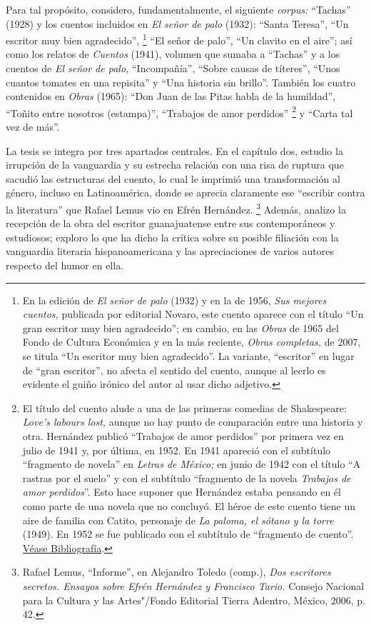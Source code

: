 \documentclass[14pt,twoside,final]{extbook} %
\let\oldfootnote\footnote
\renewcommand\footnote[1]{%
\oldfootnote{\hspace{1mm}#1}}
\begin{document}
Para tal propósito, considero, fundamentalmente, el siguiente \emph{corpus:} ``Tachas'' (1928) y los cuentos incluidos en \emph{El señor de palo} (1932): ``Santa Teresa'', ``Un escritor muy bien agradecido'',\footnote{En la edición de \emph{El señor de palo} (1932) y en la de 1956, \emph{Sus mejores cuentos,} publicada por editorial Novaro, este cuento aparece con el título ``Un gran escritor muy bien agradecido''; en cambio, en las \emph{Obras} de 1965 del Fondo de Cultura Económica y en la más reciente, \emph{Obras completas,} de 2007, se titula ``Un escritor muy bien agradecido''. La variante, ``escritor'' en lugar de ``gran escritor'', no afecta el sentido del cuento, aunque al leerlo es evidente el guiño irónico del autor al usar dicho adjetivo.} ``El señor de palo'', ``Un clavito en el aire''; así como los relatos de \emph{Cuentos} (1941), volumen que sumaba a ``Tachas'' y a los cuentos de \emph{El señor de palo,} ``Incompañía'', ``Sobre causas de títeres'', ``Unos cuantos tomates en una repisita'' y ``Una historia sin brillo''. También los cuatro contenidos en \emph{Obras} (1965): ``Don Juan de las Pitas habla de la humildad'', ``Toñito entre nosotros (estampa)'', ``Trabajos de amor perdidos''\footnote{El título del cuento alude a una de las primeras comedias de Shakespeare: \emph{Love's labours lost,} aunque no hay punto de comparación entre una historia y otra. Hernández publicó ``Trabajos de amor perdidos'' por primera vez en julio de 1941 y, por última, en 1952. En 1941 apareció con el subtítulo ``fragmento de novela'' en \emph{Letras de México;} en junio de 1942 con el título ``A rastras por el suelo'' y con el subtítulo ``fragmento de la novela \emph{Trabajos de amor perdidos}''. Esto hace suponer que Hernández estaba pensando en él como parte de una novela que no concluyó. El héroe de este cuento tiene un aire de familia con Catito, personaje de \emph{La paloma, el sótano y la torre} (1949). En 1952 se fue publicado con el subtítulo de ``fragmento de cuento''. \hyperref[bib:hernandez1952]{Véase Bibliografía}.} y ``Carta tal vez de más''.

La tesis se integra por tres apartados centrales. En el capítulo dos, estudio la irrupción de la vanguardia y su estrecha relación con una risa de ruptura que sacudió las estructuras del cuento, lo cual le imprimió una transformación al género, incluso en Latinoamérica, donde se aprecia claramente ese ``escribir contra la literatura'' que Rafael Lemus vio en Efrén Hernández.\footnote{Rafael Lemus, ``Informe'', en Alejandro Toledo (comp.), \emph{Dos escritores secretos. Ensayos sobre Efrén Hernández y Francisco Tario.} Consejo Nacional para la Cultura y las Artes"/Fondo Editorial Tierra Adentro, México, 2006, p. 42.} Además, analizo la recepción de la obra del escritor guanajuatense entre sus contemporáneos y estudiosos; exploro lo que ha dicho la crítica sobre su posible filiación con la vanguardia literaria hispanoamericana y las apreciaciones de varios autores respecto del humor en ella.
\end{document}
